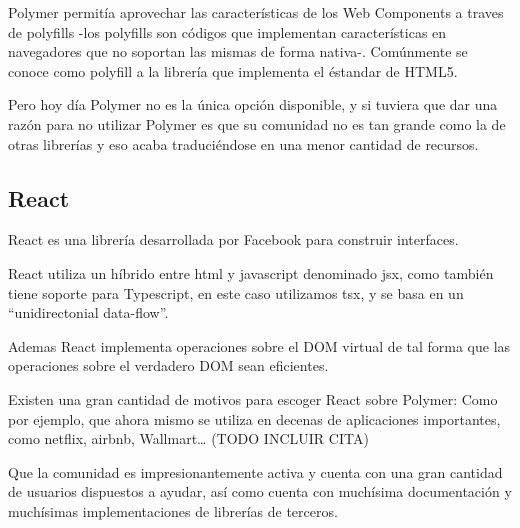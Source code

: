 \bigskip
Polymer permitía aprovechar las características de los Web Components a traves de polyfills -los polyfills son
códigos que implementan características en navegadores que no soportan las mismas de forma nativa-. Comúnmente
se conoce como polyfill a la librería que implementa el éstandar de HTML5.

\bigskip
Pero hoy día Polymer no es la única opción disponible, y si tuviera que dar una razón para no utilizar Polymer
es que su comunidad no es tan grande como la de otras librerías y eso acaba traduciéndose en una menor cantidad
de recursos.

\subsection{React}
React es una librería desarrollada por Facebook para construir interfaces.

\bigskip
React utiliza un híbrido entre html y javascript denominado jsx, como también tiene soporte para 
Typescript, en este caso utilizamos tsx, y se basa en un “unidirectonial data-flow”. 

\bigskip
Ademas React implementa operaciones sobre el DOM virtual de tal forma que las operaciones sobre
el verdadero DOM sean eficientes.

\bigskip
Existen una gran cantidad de motivos para escoger React sobre Polymer: Como por ejemplo, 
que ahora mismo se utiliza en decenas de aplicaciones importantes, como netflix, airbnb, Wallmart… (TODO INCLUIR CITA)

\bigskip
Que la comunidad es impresionantemente activa y cuenta con una gran cantidad de usuarios dispuestos a ayudar, así como cuenta con muchísima documentación y muchísimas implementaciones de librerías de terceros.
